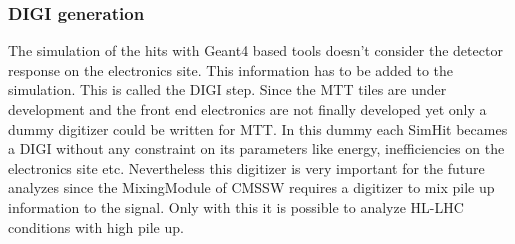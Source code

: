 		\subsubsection{DIGI generation}
			The simulation of the hits with Geant4 based tools doesn't consider the detector response on the electronics site.
			This information has to be added to the simulation.
			This is called the DIGI step.
			Since the MTT tiles are under development and the front end electronics are not finally developed yet only a dummy digitizer could be written for MTT.
			In this dummy each SimHit becames a DIGI without any constraint on its parameters like energy, inefficiencies on the electronics site etc.
			Nevertheless this digitizer is very important for the future analyzes since the MixingModule of CMSSW requires a digitizer to mix pile up information to the signal.
			Only with this it is possible to analyze HL-LHC conditions with high pile up.
